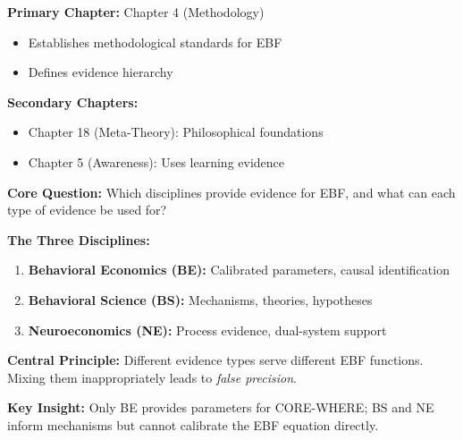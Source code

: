 \documentclass[11pt, a4paper]{article}
\begin{document}

\begin{tcolorbox}[colback=blue!5!white, colframe=blue!75!black, title=Chapter Linkage]
\textbf{Primary Chapter:} Chapter 4 (Methodology)
\begin{itemize}[nosep]
    \item Establishes methodological standards for EBF
    \item Defines evidence hierarchy
\end{itemize}

\textbf{Secondary Chapters:}
\begin{itemize}[nosep]
    \item Chapter 18 (Meta-Theory): Philosophical foundations
    \item Chapter 5 (Awareness): Uses learning evidence
\end{itemize}
\end{tcolorbox}


\begin{tcolorbox}[colback=yellow!5!white, colframe=yellow!75!black, title=Quick Reference]
\textbf{Core Question:} Which disciplines provide evidence for EBF, and what can each type of evidence be used for?

\textbf{The Three Disciplines:}
\begin{enumerate}[nosep]
    \item \textbf{Behavioral Economics (BE):} Calibrated parameters, causal identification
    \item \textbf{Behavioral Science (BS):} Mechanisms, theories, hypotheses
    \item \textbf{Neuroeconomics (NE):} Process evidence, dual-system support
\end{enumerate}

\textbf{Central Principle:} Different evidence types serve different EBF functions. Mixing them inappropriately leads to \textit{false precision}.

\textbf{Key Insight:} Only BE provides parameters for CORE-WHERE; BS and NE inform mechanisms but cannot calibrate the EBF equation directly.
\end{tcolorbox}
\end{document}
